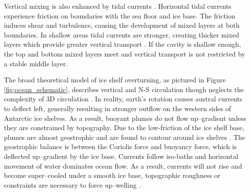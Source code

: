 Vertical mixing is also enhanced by tidal currents \citep{macayeal1984thermohaline}.  Horizontal tidal currents experience friction on boundaries with the sea floor and ice base. The friction induces shear and turbulence, causing the development of mixed layers at both boundaries. In shallow areas tidal currents are stronger, creating  thicker mixed layers which provide greater vertical transport  \citep{makinson2002modeling}. If the cavity is shallow enough, the top and bottom mixed layers meet and vertical transport is not restricted by a stable middle layer.

The broad theoretical model of ice shelf overturning, as pictured in Figure \ref{fig:ocean_schematic}, describes vertical and N-S circulation though neglects the complexity of 3D circulation \citep{holland2006effects}. In reality, earth's rotation causes austral currents to deflect left, generally resulting in stronger outflow on the western sides of Antarctic ice shelves. As a result, buoyant plumes do not flow up--gradient unless they are constrained by topography. Due to the low-friction of the ice shelf base, plumes are almost geostrophic and are found to contour around ice shelves \citep{jenkins2016simple}. The geostrophic balance is between the Coriolis force and buoyancy force, which is deflected up--gradient by the ice base. Currents follow iso-baths and horizontal movement of water dominates ocean flow. As a result, currents will not rise and become super--cooled under a smooth ice base, topographic roughness or constraints are necessary to force up--welling \citep{holland2006effects}.

